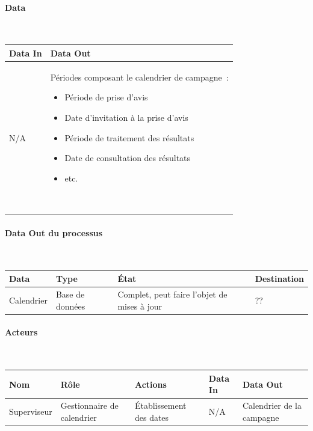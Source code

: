 \documentclass[a4paper,11pt]{report}
\begin{document}
\paragraph{Data}~\newline{}

\begin{tabularx}{\linewidth}{|X|X|} \hline
Data In & Data Out \\ \hline
N/A & Périodes composant le calendrier de campagne~:
\begin{itemize}
	\item Période de prise d'avis
	\item Date d'invitation à la prise d'avis
	\item Période de traitement des résultats
	\item Date de consultation des résultats
	\item etc.
\end{itemize}
~\\ \hline
\end{tabularx}


\paragraph{Data Out du processus}~\newline{}

\begin{tabularx}{\linewidth}{|X|X|X|X|} \hline
Data & Type & État & Destination \\ \hline
Calendrier & Base de données & Complet, peut faire l'objet de mises à jour & ?? \\ \hline
\end{tabularx}

\paragraph{Acteurs}~\newline{}

\begin{tabularx}{\linewidth}{|X|X|X|X|X|} \hline
Nom & Rôle & Actions & Data In & Data Out \\ \hline
Superviseur & Gestionnaire de calendrier & Établissement des dates & N/A & Calendrier de la campagne \\ \hline
\end{tabularx}
\end{document}
